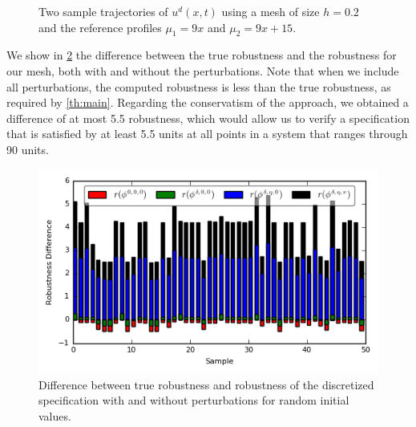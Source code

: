 \documentclass[letterpaper, 10 pt, conference]{ieeeconf/ieeeconf}
\begin{document}
\begin{figure}[!t]
    \centering 
        \hfill
        \hfill
        \caption{Two sample trajectories of $u^d(x, t)$ using a mesh of size
        $h=0.2$ and the reference profiles $\mu_1 = 9x$ and $\mu_2 = 9x + 15$.}
    \label{fig:ex2_evolution}
\end{figure}


We show in \cref{fig:res_diffs} the difference between the true robustness and
the robustness for our mesh, both with and without the perturbations. Note that
when we include all perturbations, the computed robustness is less than the true
robustness, as required by \cref{th:main}. Regarding the conservatism of the
approach, we obtained a
difference of at most 5.5 robustness, which would allow us to verify a
specification that is satisfied by at least 5.5 units at all points in a system
that ranges through 90 units. 

\begin{figure}
    \centering
    \includegraphics[width=0.8\linewidth]{figures/cs_ran_init_results.png}
    \caption{Difference between true robustness and robustness of the
        discretized specification with and without perturbations for
        random initial values.}
    \label{fig:res_diffs}
\end{figure}
\end{document}
